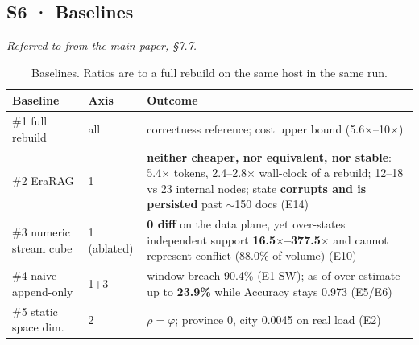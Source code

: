 \subsection*{S6 · Baselines}
\noindent\emph{Referred to from the main paper, \S7.7.}

\begin{table}[htbp]
\caption{Baselines. Ratios are to a full rebuild on the same host in the same
run.}
\label{stab:baselines}
\centering
\scriptsize
\renewcommand{\arraystretch}{1.16}
\begin{tabular}{@{}p{}p{}p{}@{}}
\toprule
\textbf{Baseline} & \textbf{Axis} & \textbf{Outcome}\\
\midrule
\#1 full rebuild & all & correctness reference; cost upper bound (5.6$\times$--10$\times$)\\
\#2 EraRAG \cite{r3} & 1 & \textbf{neither cheaper, nor equivalent, nor stable}: 5.4$\times$ tokens, 2.4--2.8$\times$ wall-clock of a rebuild; 12--18 vs 23 internal nodes; state \textbf{corrupts and is persisted} past ${\sim}$150 docs (E14)\\
\#3 numeric stream cube & 1 (ablated) & \textbf{0 diff} on the data plane, yet over-states independent support \textbf{16.5$\times$--377.5$\times$} and cannot represent conflict (88.0\% of volume) (E10)\\
\#4 naive append-only & 1+3 & window breach 90.4\% (E1-SW); as-of over-estimate up to \textbf{23.9\%} while Accuracy stays 0.973 (E5/E6)\\
\#5 static space dim. & 2 & $\rho=\varphi$; province 0, city 0.0045 on real load (E2)\\
\bottomrule
\end{tabular}
\end{table}
